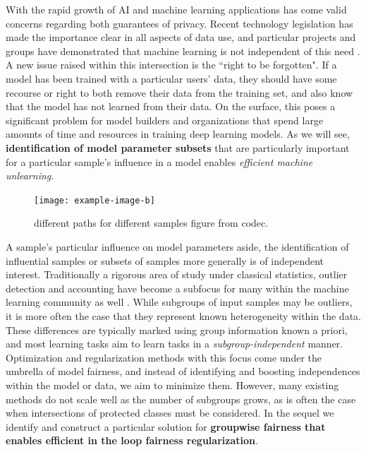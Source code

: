 With the rapid growth of AI and machine learning applications has come valid concerns regarding both guarantees of privacy.
Recent technology legislation has made the importance clear in all aspects of data use,
and particular projects and groups have demonstrated that machine learning is not independent of
this need \citep{Exposing}.
A new issue raised within this intersection is the ``right to be forgotten".
If a model has been trained with a particular users' data, 
they should have some recourse or right
to both remove their data from the training set,
and also know that the model has not learned from their data.
On the surface, this poses a significant problem for model builders
and organizations that spend large amounts
of time and resources in 
training deep learning models.
As we will see, 
\textbf{identification of model parameter subsets}
that are particularly important
for a particular sample's influence
in a model enables \textit{efficient machine unlearning}.

\begin{figure}
    \centering
    \texttt{[image: example-image-b]}
    \caption[Selecting parameter subsets]{\color{red} different paths for different samples figure from codec.}
\end{figure}

A sample's particular influence on model parameters aside, the identification of influential samples or subsets of samples more generally is of independent interest. 
Traditionally a rigorous area of study under classical statistics, outlier detection and accounting have become a subfocus for many within the machine learning community as well \citep{golatkar2020eternal,golatkar2020forgetting,huang2020feature,ren2019likelihood}.
While subgroups of input samples may be outliers, it is more often the case that they represent known heterogeneity within the data. 
These differences are typically marked using 
group information known a priori, and 
most learning tasks aim to learn tasks
in a \textit{subgroup-independent} manner.
Optimization and regularization methods with this focus come under the umbrella of model fairness, and instead of identifying and boosting independences within the model or data, we aim to minimize them.
However, many existing methods do not scale well as the number of subgroups grows, as is often the case when intersections of protected classes must be considered. In the sequel we identify and construct a particular solution for \textbf{groupwise fairness that enables efficient in the loop fairness regularization}.

